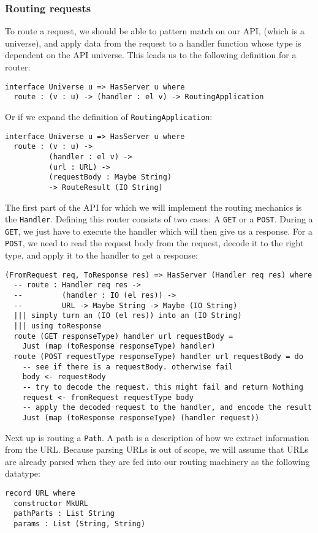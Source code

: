 \documentclass[12pt,a4paper]{article}
\begin{document}
\subsubsection{Routing requests}
To route a request, we should be able to pattern match on our API, (which is a universe), and apply data from the request
to a handler function whose type is dependent on the API universe. This leads us to the following definition for a router:
\begin{verbatim}
interface Universe u => HasServer u where
  route : (v : u) -> (handler : el v) -> RoutingApplication
\end{verbatim}
Or if we expand the definition of \texttt{RoutingApplication}:
\begin{verbatim}
interface Universe u => HasServer u where
  route : (v : u) ->
          (handler : el v) ->
          (url : URL) ->
          (requestBody : Maybe String)
          -> RouteResult (IO String)
\end{verbatim}

The first part of the API for which we will implement the routing mechanics is the \texttt{Handler}.
Defining this router consists of two cases: A \texttt{GET} or a \texttt{POST}.
During a \texttt{GET}, we just have to execute the handler which will then give us a response. 
For a \texttt{POST}, we need to read the request body from the request, decode it to the right type, and
apply it to the handler to get a response:
\begin{verbatim}
(FromRequest req, ToResponse res) => HasServer (Handler req res) where
  -- route : Handler req res -> 
  --         (handler : IO (el res)) ->
  --         URL -> Maybe String -> Maybe (IO String)
  ||| simply turn an (IO (el res)) into an (IO String) 
  ||| using toResponse
  route (GET responseType) handler url requestBody =
    Just (map (toResponse responseType) handler)
  route (POST requestType responseType) handler url requestBody = do
    -- see if there is a requestBody. otherwise fail
    body <- requestBody
    -- try to decode the request. this might fail and return Nothing
    request <- fromRequest requestType body
    -- apply the decoded request to the handler, and encode the result
    Just (map (toResponse responseType) (handler request))
\end{verbatim}

Next up is routing a \texttt{Path}. A path 
is a description of how we extract information from the URL. Because parsing URLs
is out of scope, we will assume that URLs are already parsed when they are fed into our
routing machinery as the following datatype:
\begin{verbatim}
record URL where
  constructor MkURL
  pathParts : List String
  params : List (String, String)
\end{verbatim}
\end{document}
